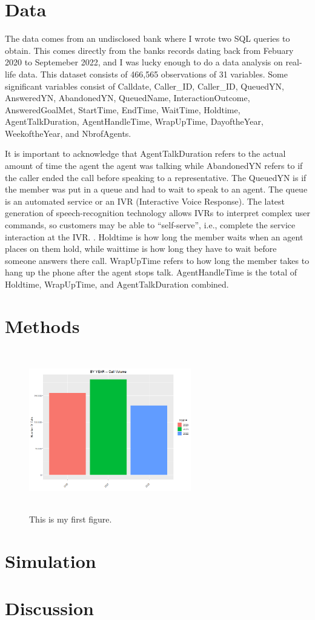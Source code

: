 \documentclass[12pt]{article}
\begin{document}
\section*{Data}
\begin{sloppypar}
  The data comes from an undisclosed bank where I wrote two SQL queries to obtain. This comes directly from the banks records dating back from Febuary 2020
  to Septemeber 2022, and I was lucky enough to do a data analysis on real-life data. This dataset consists of 466,565 observations of 31 variables. 
  Some significant variables consist of Calldate, Caller_ID, Caller_ID, QueuedYN, AnsweredYN, AbandonedYN, QueuedName, InteractionOutcome, 
  AnsweredGoalMet, StartTime, EndTime, WaitTime, Holdtime, AgentTalkDuration, AgentHandleTime, WrapUpTime, DayoftheYear,
  WeekoftheYear, and NbrofAgents.
\end{sloppypar}
  It is important to acknowledge that AgentTalkDuration refers to the actual amount of time the agent the agent was talking while
AbandonedYN refers to if the caller ended the call before speaking to a representative. The QueuedYN is if the member was put in a queue and had to wait to speak to an agent.
The queue is an automated service or an IVR (Interactive Voice Response). The latest generation of speech-recognition technology allows
IVRs to interpret complex user commands, so customers may be able to “self-serve”, i.e., complete the service interaction at the IVR. \citep{avramidis2005modeling}.
Holdtime is how long the member waits when an agent places on them hold, while waittime is how long they have to wait before someone answers there call.
WrapUpTime refers to how long the member takes to hang up the phone after the agent stops talk. AgentHandleTime is the total of Holdtime, WrapUpTime, and AgentTalkDuration combined.


\section*{Methods}
\begin{figure}[H]
    \centering
    \includegraphics[width=200pt,height=200pt]{By Year.png}
    \caption{This is my first figure.}
    \label{fig:Year}
  \end{figure}

\section*{Simulation}



\section*{Discussion}




\end{document}
